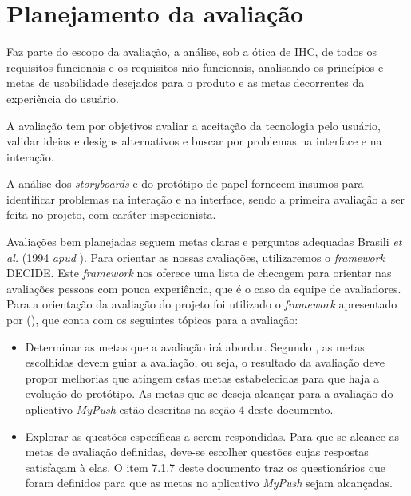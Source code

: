 \chapter{Planejamento da avaliação}

    Faz parte do escopo da avaliação, a análise, sob a ótica de IHC, de todos os requisitos funcionais e os
    requisitos não-funcionais, analisando os princípios e metas de usabilidade desejados para o produto e as
    metas decorrentes da experiência do usuário.

    A avaliação tem por objetivos avaliar a aceitação da tecnologia pelo usuário, validar ideias e designs alternativos e buscar 
    por problemas na interface e na interação.
  
    A análise dos \textit{storyboards} e do protótipo de papel fornecem insumos para identificar problemas na interação e na interface,
    sendo a primeira avaliação a ser feita no projeto, com caráter inspecionista.
    
    Avaliações bem planejadas seguem metas claras e perguntas adequadas Brasili \textit{et al.} (1994 \textit{apud} \cite{preece}).
    Para orientar as nossas avaliações, utilizaremos o \textit{framework} DECIDE. Este \textit{framework} nos oferece uma lista
    de checagem para orientar nas avaliações pessoas com pouca experiência, que é o caso da equipe de avaliadores. Para
    a orientação da avaliação do projeto foi utilizado o \textit{framework} apresentado por \citeauthor{preece} (\citeyear{preece}),
    que conta com os seguintes tópicos para a avaliação:
    
    \begin{itemize}
       \item Determinar as metas que a avaliação irá abordar.
       \subitem Segundo \cite{preece}, as metas escolhidas devem guiar a avaliação, ou seja, o resultado da avaliação deve propor melhorias 
       que atingem estas metas estabelecidas para que haja a evolução do protótipo. As metas que se deseja alcançar para a avaliação do 
       aplicativo \textit{MyPush} estão descritas na seção 4 deste documento.
    \end{itemize}
    
    \begin{itemize}
    
       \item Explorar as questões específicas a serem respondidas.
       \subitem Para que se alcance as metas de avaliação definidas, deve-se escolher questões cujas respostas satisfaçam à elas. 
       O item 7.1.7 deste documento traz os questionários que foram definidos para que as metas no aplicativo \textit{MyPush} sejam alcançadas.
       
    \end{itemize}
    
